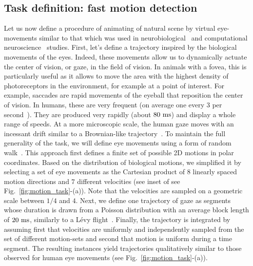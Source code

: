 \documentclass[default]{sn-jnl}%
\theoremstyle{thmstyleone}%
\theoremstyle{thmstyletwo}%
\theoremstyle{thmstylethree}%
\newcommand{\seeFig}[1]{see Fig.~\ref{fig:#1}}%
\begin{document}
\subsection{Task definition: fast motion detection}
Let us now define a procedure of animating of natural scene by virtual eye-movements  similar to that which was used in neurobiological~\citep{baudot_animation_2013} and computational neuroscience~\citep{kremkow_push-pull_2016} studies. First, let's define a trajectory inspired by the biological movements of the eyes. Indeed, these movements allow us to dynamically actuate the center of vision, or gaze, in the field of vision. In animals with a fovea, this is particularly useful as it allows to move the area with the highest density of photoreceptors in the environment, for example at a point of interest. For example, saccades are rapid movements of the eyeball that reposition the center of vision. In humans, these are very frequent (on average one every 3 per second~\citep{dandekar_neural_2012}). They are produced very rapidly (about $80~\si{\milli\second}$) and display a whole range of speeds. At a more microscopic scale, the human gaze moves with an incessant drift similar to a Brownian-like trajectory~\citep{poletti_head-eye_2015}. To maintain the full generality of the task, we will define eye movements using a form of random walk~\citep{engbert_integrated_2011}. This approach first defines a finite set of possible 2D motions in polar coordinates. Based on the distribution of biological motions, we simplified it by selecting a set of eye movements as the Cartesian product of %
$8$ linearly spaced motion directions and %
$7$ different velocities (see inset of \seeFig{motion_task}-(a)). Note that the velocities are sampled on a geometric scale between $1/4$ and $4$. Next, we define one trajectory of gaze as segments whose duration is drawn from a Poisson distribution with an average block length of $20~\si{\milli\second}$, similarly to a Lévy flight~\citep[p. 289]{mandelbrot_fractal_1982}. Finally, the trajectory is integrated by assuming first that velocities are uniformly and independently sampled from the set of different motion-sets and second that motion is uniform during a time segment. The resulting instances yield trajectories qualitatively similar to those observed for human eye movements (\seeFig{motion_task}-(a)). 
\end{document}

